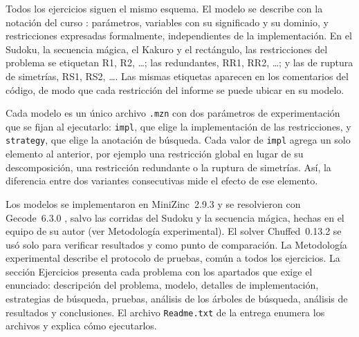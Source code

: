 Todos los ejercicios siguen el mismo esquema. El modelo se describe con la notación del curso \parencite{apt2003principles}: parámetros, variables con su significado y su dominio, y restricciones expresadas formalmente, independientes de la implementación. En el Sudoku, la secuencia mágica, el Kakuro y el rectángulo, las restricciones del problema se etiquetan R1, R2, \ldots; las redundantes, RR1, RR2, \ldots; y las de ruptura de simetrías, RS1, RS2, \ldots. Las mismas etiquetas aparecen en los comentarios del código, de modo que cada restricción del informe se puede ubicar en su modelo.

Cada modelo es un único archivo \texttt{.mzn} con dos parámetros de experimentación que se fijan al ejecutarlo: \texttt{impl}, que elige la implementación de las restricciones, y \texttt{strategy}, que elige la anotación de búsqueda. Cada valor de \texttt{impl} agrega un solo elemento al anterior, por ejemplo una restricción global en lugar de su descomposición, una restricción redundante o la ruptura de simetrías. Así, la diferencia entre dos variantes consecutivas mide el efecto de ese elemento.

Los modelos se implementaron en MiniZinc~2.9.3 y se resolvieron con Gecode~6.3.0 \parencite{gecode}, salvo las corridas del Sudoku y la secuencia mágica, hechas en el equipo de su autor (ver Metodología experimental). El solver Chuffed~0.13.2 se usó solo para verificar resultados y como punto de comparación. La Metodología experimental describe el protocolo de pruebas, común a todos los ejercicios. La sección Ejercicios presenta cada problema con los apartados que exige el enunciado: descripción del problema, modelo, detalles de implementación, estrategias de búsqueda, pruebas, análisis de los árboles de búsqueda, análisis de resultados y conclusiones. El archivo \texttt{Readme.txt} de la entrega enumera los archivos y explica cómo ejecutarlos.

